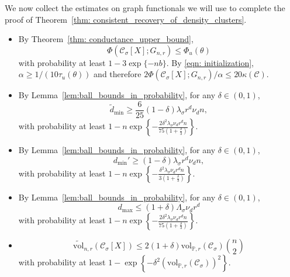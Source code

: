 \documentclass[11pt,twoside]{article}
\newcommand{\set}[1]{\left\{#1\right\}}
\newcommand{\vol}{\mathrm{vol}}
\newcommand{\1}{\mathbbm{1}}
\newcommand{\Phibf}{\Phi_{u}}
\newcommand{\taubf}{\tau_{u}}
\newcommand{\Xbf}{X}
\newcommand{\Pbb}{\mathbb{P}}
\newcommand{\Cset}{\mathcal{C}}
\newcommand{\Csig}{\Cset_{\sigma}}
\newcommand{\degminpr}{d_{\min}'}
\newcommand{\degminwt}{\widetilde{d}_{\min}}
\begin{document}
We now collect the estimates on graph functionals we will use to complete the proof of Theorem~\ref{thm: consistent_recovery_of_density_clusters}. 
\begin{itemize}
	\item By Theorem~\ref{thm: conductance_upper_bound},
	\begin{equation*}
	\Phi(\Csig[\Xbf]; G_{n,r}) \leq \Phibf(\theta) 
	\end{equation*}
	with probability at least $1 - 3\exp\{-nb\}$. By \eqref{eqn: initialization}, $\alpha \geq 1/(10 \taubf(\theta))$ and therefore $2 \Phi(\Csig[\Xbf]; G_{n,r})/\alpha \leq 20 \kappa(\Cset)$.
	\item By Lemma~\ref{lem:ball_bounds_in_probability}, for any $\delta \in (0,1)$,
	\begin{equation*}
	\degminwt \geq \frac{6}{25}(1 - \delta) \lambda_{\sigma} r^d \nu_d n,
	\end{equation*}
	with probability at least $1 - n\exp\set{-\frac{2 \delta^2 \lambda_{\sigma} \nu_d r^d n}{75(1 + \frac{\delta}{3})}}$.
	\item By Lemma~\ref{lem:ball_bounds_in_probability}, for any $\delta \in (0,1)$,
	\begin{equation*}
	\degminpr \geq (1 - \delta) \lambda_{\sigma} r^d \nu_d n,
	\end{equation*}
	with probability at least $1 - n\exp\set{-\frac{\delta^2 \lambda_{\sigma} \nu_d r^d n}{3(1 + \frac{\delta}{3})}}$.
	
	\item By Lemma~\ref{lem:ball_bounds_in_probability}, for any $\delta \in (0,1)$,
	\begin{equation*}
	d_{\max} \leq (1 + \delta) \Lambda_{\sigma} \nu_d r^d
	\end{equation*}
	with probability at least $1 - n\exp\set{-\frac{2\delta^2 \lambda_{\sigma} \nu_d r^d n}{75(1 + \frac{\delta}{3})}}$.
	
	\item 
	\begin{equation*}
	\widetilde{\vol}_{n,r}(\Csig[\Xbf]) \leq 2(1 + \delta) \vol_{\Pbb,r}(\Csig){n \choose 2}
	\end{equation*}
	with probability at least $1 - \exp\set{-\delta^2 (\vol_{\Pbb,r}(\Csig))^2}$.
\end{itemize}
\end{document}

